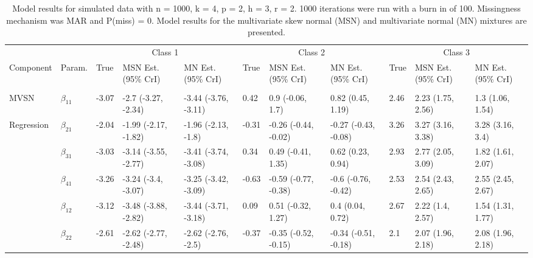 \documentclass{article}
\begin{document}
\begin{landscape}\begin{table}[t]

\caption{\label{tab:unnamed-chunk-4}Model results for simulated data with n = 1000, k = 4, p = 2, h = 3, r = 2. 1000 iterations were run with a burn in of 100. Missingness mechanism was MAR and P(miss) = 0. Model results for the multivariate skew normal (MSN) and multivariate normal (MN) mixtures are presented.}
\centering
\fontsize{6}{8}\selectfont
\begin{tabular}{lllllllllll}
\toprule
\multicolumn{2}{c}{ } & \multicolumn{3}{c}{Class 1} & \multicolumn{3}{c}{Class 2} & \multicolumn{3}{c}{Class 3} \\
\cmidrule(l{3pt}r{3pt}){3-5} \cmidrule(l{3pt}r{3pt}){6-8} \cmidrule(l{3pt}r{3pt}){9-11}
Component & Param. & True & MSN Est. (95\% CrI) & MN Est. (95\% CrI)  & True & MSN Est. (95\% CrI) & MN Est. (95\% CrI) & True & MSN Est. (95\% CrI) & MN Est. (95\% CrI)\\
\midrule
\addlinespace[0.3em]
\multicolumn{11}{l}{\textbf{ }}\\
\hspace{1em}MVSN & $\beta_{11}$ & -3.07 & -2.7 (-3.27, -2.34) & -3.44 (-3.76, -3.11) & 0.42 & 0.9 (-0.06, 1.7) & 0.82 (0.45, 1.19) & 2.46 & 2.23 (1.75, 2.56) & 1.3 (1.06, 1.54)\\
\hspace{1em}Regression & $\beta_{21}$ & -2.04 & -1.99 (-2.17, -1.82) & -1.96 (-2.13, -1.8) & -0.31 & -0.26 (-0.44, -0.02) & -0.27 (-0.43, -0.08) & 3.26 & 3.27 (3.16, 3.38) & 3.28 (3.16, 3.4)\\
\hspace{1em} & $\beta_{31}$ & -3.03 & -3.14 (-3.55, -2.77) & -3.41 (-3.74, -3.08) & 0.34 & 0.49 (-0.41, 1.35) & 0.62 (0.23, 0.94) & 2.93 & 2.77 (2.05, 3.09) & 1.82 (1.61, 2.07)\\
\hspace{1em} & $\beta_{41}$ & -3.26 & -3.24 (-3.4, -3.07) & -3.25 (-3.42, -3.09) & -0.63 & -0.59 (-0.77, -0.38) & -0.6 (-0.76, -0.42) & 2.53 & 2.54 (2.43, 2.65) & 2.55 (2.45, 2.67)\\
\hspace{1em} & $\beta_{12}$ & -3.12 & -3.48 (-3.88, -2.82) & -3.44 (-3.71, -3.18) & 0.09 & 0.51 (-0.32, 1.27) & 0.4 (0.04, 0.72) & 2.67 & 2.22 (1.4, 2.57) & 1.54 (1.31, 1.77)\\
\hspace{1em} & $\beta_{22}$ & -2.61 & -2.62 (-2.77, -2.48) & -2.62 (-2.76, -2.5) & -0.37 & -0.35 (-0.52, -0.15) & -0.34 (-0.51, -0.18) & 2.1 & 2.07 (1.96, 2.18) & 2.08 (1.96, 2.18)\\

\end{tabular}
\end{table}
\end{landscape}
\end{document}
